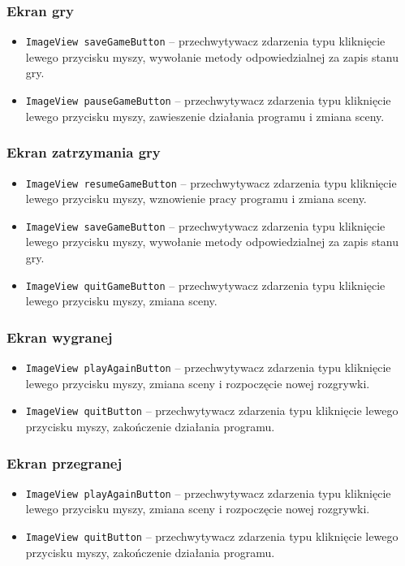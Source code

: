 \documentclass[a4paper]{article}
\newcommand{\prog}{\texttt}
\begin{document}
\subsubsection{Ekran gry}
\begin{itemize}
    \item \prog{ImageView saveGameButton} -- przechwytywacz zdarzenia typu kliknięcie lewego przycisku myszy, wywołanie metody odpowiedzialnej za zapis stanu gry.
    \item \prog{ImageView pauseGameButton} -- przechwytywacz zdarzenia typu kliknięcie lewego przycisku myszy, zawieszenie działania programu i zmiana sceny.
\end{itemize}

\subsubsection{Ekran zatrzymania gry}
\begin{itemize}
    \item \prog{ImageView resumeGameButton} -- przechwytywacz zdarzenia typu kliknięcie lewego przycisku myszy, wznowienie pracy programu i zmiana sceny.
    \item \prog{ImageView saveGameButton} -- przechwytywacz zdarzenia typu kliknięcie lewego przycisku myszy, wywołanie metody odpowiedzialnej za zapis stanu gry.
    \item \prog{ImageView quitGameButton} -- przechwytywacz zdarzenia typu kliknięcie lewego przycisku myszy, zmiana sceny.    
\end{itemize}

\subsubsection{Ekran wygranej}
\begin{itemize}
    \item \prog{ImageView playAgainButton} -- przechwytywacz zdarzenia typu kliknięcie lewego przycisku myszy, zmiana sceny i rozpoczęcie nowej rozgrywki.
    \item \prog{ImageView quitButton} -- przechwytywacz zdarzenia typu kliknięcie lewego przycisku myszy, zakończenie działania programu.
\end{itemize}

\subsubsection{Ekran przegranej}
\begin{itemize}
    \item \prog{ImageView playAgainButton} -- przechwytywacz zdarzenia typu kliknięcie lewego przycisku myszy, zmiana sceny i rozpoczęcie nowej rozgrywki.
    \item \prog{ImageView quitButton} -- przechwytywacz zdarzenia typu kliknięcie lewego przycisku myszy, zakończenie działania programu.    
\end{itemize}
\end{document}
